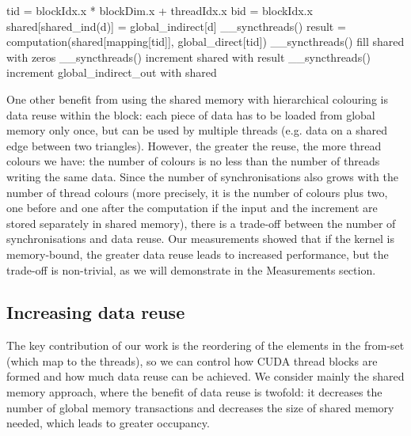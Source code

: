 \begin{algorithm}
  \begin{algorithmic}
    \State tid = blockIdx.x * blockDim.x + threadIdx.x
    \State bid = blockIdx.x
      \State shared[shared\_ind(d)] = global\_indirect[d]
    \EndFor
    \State \_\_syncthreads()
    \State result = computation(shared[mapping[tid]], global\_direct[tid])
    \State \_\_syncthreads()
    \State fill shared with zeros
    \State \_\_syncthreads()
        \State increment shared with result
      \EndIf
      \State \_\_syncthreads()
    \EndFor
      \State increment global\_indirect\_out with shared
    \EndFor
  \end{algorithmic}
  \caption{Algorithm to use the shared memory to preload indirect data accessed
  within a thread block. \lstinline!global_indirect! holds the data indirectly
  read, \lstinline!global_indirect_out! holds the result of the iteration.}
  \label{code:shared}
\end{algorithm}

One other benefit from using the shared memory with hierarchical colouring is
data reuse within the block: each piece of data has to be loaded from global
memory only once, but can be used by multiple threads (e.g. data on a shared
edge between two triangles). However, the greater the reuse, the more thread
colours we have: the number of colours is no less than the number of threads
writing the same data. Since the number of synchronisations also grows with the
number of thread colours (more precisely, it is the number of colours plus two,
one before and one after the computation if the input and the increment are
stored separately in shared memory), there is a trade-off between the number of
synchronisations and data reuse. Our measurements showed that if the kernel is
memory-bound, the greater data reuse leads to increased performance, but the
trade-off is non-trivial, as we will demonstrate in the Measurements section.

\subsection{Increasing data reuse}\label{increasing-data-reuse}
The key contribution of our work is the reordering of the elements in the
from-set (which map to the threads), so we can control how CUDA thread blocks
are formed and how much data reuse can be achieved. We consider mainly the
shared memory approach, where the benefit of data reuse is twofold: it decreases
the number of global memory transactions and decreases the size of shared memory
needed, which leads to greater occupancy.

